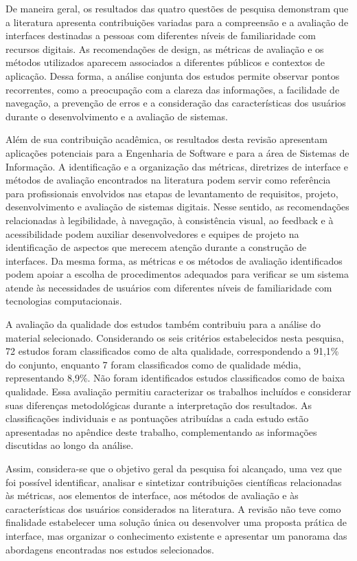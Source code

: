 De maneira geral, os resultados das quatro questões de pesquisa demonstram que a literatura apresenta contribuições variadas para a compreensão e a avaliação de interfaces destinadas a pessoas com diferentes níveis de familiaridade com recursos digitais. As recomendações de design, as métricas de avaliação e os métodos utilizados aparecem associados a diferentes públicos e contextos de aplicação. Dessa forma, a análise conjunta dos estudos permite observar pontos recorrentes, como a preocupação com a clareza das informações, a facilidade de navegação, a prevenção de erros e a consideração das características dos usuários durante o desenvolvimento e a avaliação de sistemas.

Além de sua contribuição acadêmica, os resultados desta revisão apresentam aplicações potenciais para a Engenharia de Software e para a área de Sistemas de Informação. A identificação e a organização das métricas, diretrizes de interface e métodos de avaliação encontrados na literatura podem servir como referência para profissionais envolvidos nas etapas de levantamento de requisitos, projeto, desenvolvimento e avaliação de sistemas digitais. Nesse sentido, as recomendações relacionadas à legibilidade, à navegação, à consistência visual, ao feedback e à acessibilidade podem auxiliar desenvolvedores e equipes de projeto na identificação de aspectos que merecem atenção durante a construção de interfaces. Da mesma forma, as métricas e os métodos de avaliação identificados podem apoiar a escolha de procedimentos adequados para verificar se um sistema atende às necessidades de usuários com diferentes níveis de familiaridade com tecnologias computacionais.

A avaliação da qualidade dos estudos também contribuiu para a análise do material selecionado. Considerando os seis critérios estabelecidos nesta pesquisa, 72 estudos foram classificados como de alta qualidade, correspondendo a 91,1\% do conjunto, enquanto 7 foram classificados como de qualidade média, representando 8,9\%. Não foram identificados estudos classificados como de baixa qualidade. Essa avaliação permitiu caracterizar os trabalhos incluídos e considerar suas diferenças metodológicas durante a interpretação dos resultados. As classificações individuais e as pontuações atribuídas a cada estudo estão apresentadas no apêndice deste trabalho, complementando as informações discutidas ao longo da análise.

Assim, considera-se que o objetivo geral da pesquisa foi alcançado, uma vez que foi possível identificar, analisar e sintetizar contribuições científicas relacionadas às métricas, aos elementos de interface, aos métodos de avaliação e às características dos usuários considerados na literatura. A revisão não teve como finalidade estabelecer uma solução única ou desenvolver uma proposta prática de interface, mas organizar o conhecimento existente e apresentar um panorama das abordagens encontradas nos estudos selecionados.

